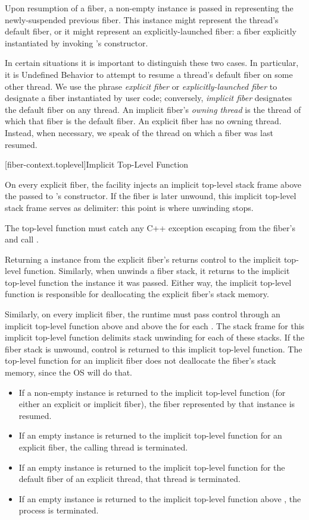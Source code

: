 Upon resumption of a fiber, a non-empty \fiber instance is passed in
representing the newly-suspended previous fiber. This \fiber instance might
represent the thread's default fiber, or it might represent an
explicitly-launched fiber: a fiber explicitly instantiated by
invoking \fiber's constructor.

In certain situations it is important to distinguish these two cases. In
particular, it is Undefined Behavior to attempt to resume a thread's default
fiber on some other thread. We use the phrase \emph{explicit fiber}
or \emph{explicitly-launched fiber} to designate a fiber instantiated by user
code; conversely, \emph{implicit fiber} designates the default fiber on any
thread. An implicit fiber's \emph{owning thread} is the thread of which that
fiber is the default fiber. An explicit fiber has no owning thread. Instead,
when necessary, we speak of the thread on which a fiber was last resumed.

[fiber-context.toplevel]{Implicit Top-Level Function}

On every explicit fiber, the facility injects an implicit top-level stack
frame above the \entryfn passed to \fiber's constructor. If the fiber is later
unwound, this implicit top-level stack frame serves as delimiter: this point
is where unwinding stops.

The top-level function must catch any C++ exception escaping from the
fiber's \entryfn and call .

Returning a \fiber instance from the explicit fiber's \entryfn returns control
to the implicit top-level function. Similarly, when \unwindfib unwinds a fiber
stack, it returns to the implicit top-level function the \fiber instance it
was passed. Either way, the implicit top-level function is responsible for
deallocating the explicit fiber's stack memory.

Similarly, on every implicit fiber, the runtime must pass control through an
implicit top-level function above \main and above the \entryfn for
each \thread. The stack frame for this implicit top-level function delimits
stack unwinding for each of these stacks. If the fiber stack is unwound,
control is returned to this implicit top-level function. The top-level
function for an implicit fiber does not deallocate the fiber's stack memory,
since the OS will do that.

\begin{itemize}
    \item If a non-empty \fiber instance is returned to the implicit top-level
    function (for either an explicit or implicit fiber), the fiber represented
    by that \fiber instance is resumed.
    \item If an empty \fiber instance is returned to the implicit top-level
    function for an explicit fiber, the calling thread is terminated.
    \item If an empty \fiber instance is returned to the implicit top-level
    function for the default fiber of an explicit thread, that thread is
    terminated.
    \item If an empty \fiber instance is returned to the implicit top-level
    function above \main, the process is terminated.
\end{itemize}

